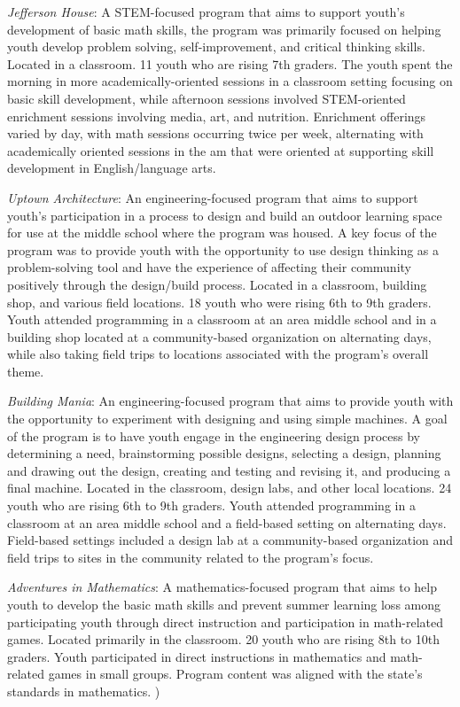 \documentclass[]{msu-thesis}
\theoremstyle{definition}
\theoremstyle{definition}
\theoremstyle{definition}
\theoremstyle{remark}
\begin{document}
\emph{Jefferson House}: A STEM-focused program that aims to support
youth's development of basic math skills, the program was primarily
focused on helping youth develop problem solving, self-improvement, and
critical thinking skills. Located in a classroom. 11 youth who are
rising 7th graders. The youth spent the morning in more
academically-oriented sessions in a classroom setting focusing on basic
skill development, while afternoon sessions involved STEM-oriented
enrichment sessions involving media, art, and nutrition. Enrichment
offerings varied by day, with math sessions occurring twice per week,
alternating with academically oriented sessions in the am that were
oriented at supporting skill development in English/language arts.

\emph{Uptown Architecture}: An engineering-focused program that aims to
support youth's participation in a process to design and build an
outdoor learning space for use at the middle school where the program
was housed. A key focus of the program was to provide youth with the
opportunity to use design thinking as a problem-solving tool and have
the experience of affecting their community positively through the
design/build process. Located in a classroom, building shop, and various
field locations. 18 youth who were rising 6th to 9th graders. Youth
attended programming in a classroom at an area middle school and in a
building shop located at a community-based organization on alternating
days, while also taking field trips to locations associated with the
program's overall theme.

\emph{Building Mania}: An engineering-focused program that aims to
provide youth with the opportunity to experiment with designing and
using simple machines. A goal of the program is to have youth engage in
the engineering design process by determining a need, brainstorming
possible designs, selecting a design, planning and drawing out the
design, creating and testing and revising it, and producing a final
machine. Located in the classroom, design labs, and other local
locations. 24 youth who are rising 6th to 9th graders. Youth attended
programming in a classroom at an area middle school and a field-based
setting on alternating days. Field-based settings included a design lab
at a community-based organization and field trips to sites in the
community related to the program's focus.

\emph{Adventures in Mathematics}: A mathematics-focused program that
aims to help youth to develop the basic math skills and prevent summer
learning loss among participating youth through direct instruction and
participation in math-related games. Located primarily in the classroom.
20 youth who are rising 8th to 10th graders. Youth participated in
direct instructions in mathematics and math-related games in small
groups. Program content was aligned with the state's standards in
mathematics. )
\end{document}
